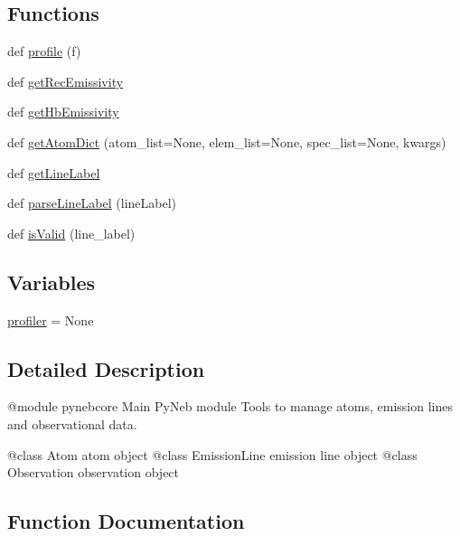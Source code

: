 \subsection*{Functions}
\begin{DoxyCompactItemize}
\item 
def \hyperlink{namespacepyneb_1_1core_1_1pynebcore_aae0baf03bd810ce431563cc0c64c3996}{profile} (f)
\item 
def \hyperlink{namespacepyneb_1_1core_1_1pynebcore_aba9d4a5306330dd47f8a51455514c017}{get\+Rec\+Emissivity}
\item 
def \hyperlink{namespacepyneb_1_1core_1_1pynebcore_a027537ead17492a35c3e4e940cd95223}{get\+Hb\+Emissivity}
\item 
def \hyperlink{namespacepyneb_1_1core_1_1pynebcore_a4e1b2e2f554c7c9c0b76419a45b2ee59}{get\+Atom\+Dict} (atom\+\_\+list=None, elem\+\_\+list=None, spec\+\_\+list=None, kwargs)
\item 
def \hyperlink{namespacepyneb_1_1core_1_1pynebcore_a14c882fc308d727f77ed33c1f56212e4}{get\+Line\+Label}
\item 
def \hyperlink{namespacepyneb_1_1core_1_1pynebcore_a9fa8b0b7efdd4da21a816641bf17dcc7}{parse\+Line\+Label} (line\+Label)
\item 
def \hyperlink{namespacepyneb_1_1core_1_1pynebcore_a3bc988a0c3e90099888bef4e59f882b1}{is\+Valid} (line\+\_\+label)
\end{DoxyCompactItemize}
\subsection*{Variables}
\begin{DoxyCompactItemize}
\item 
\hyperlink{namespacepyneb_1_1core_1_1pynebcore_ab9e20b2acbbf8eec3da84081929fae24}{profiler} = None
\end{DoxyCompactItemize}


\subsection{Detailed Description}
\begin{DoxyVerb}@module pynebcore
Main PyNeb module
Tools to manage atoms, emission lines and observational data.

@class Atom           atom object
@class EmissionLine   emission line object
@class Observation    observation object\end{DoxyVerb}
 

\subsection{Function Documentation}
\hypertarget{namespacepyneb_1_1core_1_1pynebcore_a4e1b2e2f554c7c9c0b76419a45b2ee59}{}
